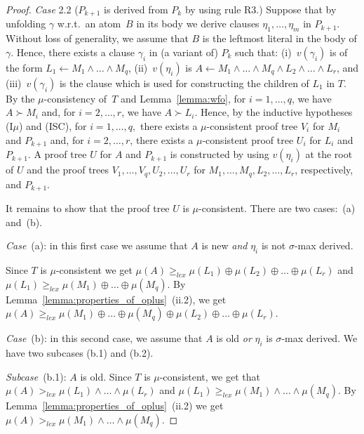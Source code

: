 \documentclass[english]{tlp}
\renewcommand{\mathit}{\displaystyle}
\begin{document}
\begin{proof}
\noindent \emph{Case} 2.2 ($P_{k+1}$ is derived from $P_k$ by using
rule R3.) Suppose that by unfolding $\gamma$ w.r.t.~an atom~$B$ in
its body we derive clauses $\eta_1,\ldots,\eta_m$ in $P_{k+1}$.
Without loss of generality, we assume that $B$ is the leftmost
literal in the body of $\gamma$. Hence, there exists a clause
$\gamma_i$ in (a variant of) $P_k$ such that: (i)~$v(\gamma_i)$ is
of the form $L_1 \leftarrow M_1\wedge \ldots \wedge M_q$,
(ii)~$v(\eta_i)$ is $A\leftarrow M_1 \wedge \ldots \wedge M_q \wedge
L_2 \wedge \ldots \wedge L_r$, and (iii)~$v(\gamma_i)$ is the clause
which is used for constructing the children of $L_1$ in $T$. By the
\mbox{$\mu$-consistency} of~$T$ and Lemma~\ref{lemma:wfo}, for \(
i=1,\ldots ,q\), we have $A \succ M_i$ and, for \( i=2,\ldots ,r \),
we have $A \succ L_i$. Hence, by the inductive hypotheses (I$\mu$)
and (ISC), for \( i=1,\ldots ,q,\) there exists a $\mu$-consistent
proof tree \(V_{i} \) for \( M_{i} \) and \( P_{k+1} \) and, for \(
i=2,\ldots ,r \), there exists a $\mu$-consistent proof tree \(U_{i}
\) for \( L_{i} \) and \( P_{k+1} \). A proof tree $U$ for $A$ and $ P_{k+1}$ is
constructed by using $v(\eta_i)$ at the root of $U$ and the proof trees
$V_1,\ldots,V_q,U_2,\ldots,U_r$ for $M_1, \ldots,M_q,L_2,\ldots,
L_r$,  respectively, and $P_{k+1}$.

It remains to show that the proof tree $U$ is $\mu$-consistent.
There are two cases:~(a) and~(b).

\noindent
{\it{Case}}~(a): in this first case we assume that
 $A$ is new {\it{and}} $\eta_i$ is not $\sigma$-max
derived. 


\noindent
Since $T$ is $\mu$-consistent
we get $\mu(A)\geq_{\mathit{lex}} \mu(L_1) \oplus \mu(L_2) \oplus 
\ldots  \oplus \mu(L_r)$ and
 $\mu(L_1)\geq_{\mathit{lex}} \mu(M_1) \oplus 
\ldots  \oplus \mu(M_q)$. By
Lemma~\ref{lemma:properties_of_oplus}~(ii.2), we get
$\mu(A)\geq_{\mathit{lex}} \mu(M_1) \oplus 
\ldots  \oplus \mu(M_q) \oplus \mu(L_2) \oplus 
\ldots  \oplus \mu(L_r)$.


\noindent 
{\it{Case}}~(b): in this second case, we assume that $A$ is
old {\it{or}} $\eta_i$ is $\sigma$-max derived. We have two subcases (b.1)
and (b.2).

\noindent
{\emph{Subcase}}~(b.1): $A$ is
old. Since $T$ is $\mu$-consistent, we get that
$\mu(A)>_{\mathit{lex}}\mu(L_1)\wedge \ldots \wedge \mu(L_r)$
and $\mu(L_1)\geq_{\mathit{lex}}\mu(M_1)\wedge \ldots \wedge \mu(M_q)$.
By Lemma~\ref{lemma:properties_of_oplus}~(ii.2) we get 
$\mu(A)>_{\mathit{lex}}\mu(M_1)\wedge \ldots \wedge \mu(M_q)$.


\end{proof}
\end{document}

